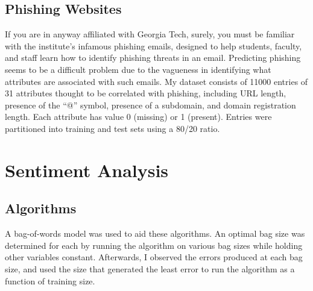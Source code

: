\documentclass[11pt, a4paper]{article} %
\begin{document}
\subsection{Phishing Websites} %
If you are in anyway affiliated with Georgia Tech, surely, you must be familiar with the institute's infamous phishing emails, designed to help students, faculty, and staff learn how to identify phishing threats in an email. Predicting phishing seems to be a difficult problem due to the vagueness in identifying what attributes are associated with such emails. My dataset consists of 11000 entries of 31 attributes thought to be correlated with phishing, including URL length, presence of the ``@'' symbol, presence of a subdomain, and domain registration length. Each attribute has value 0 (missing) or 1 (present). Entries were partitioned into training and test sets using a 80/20 ratio.


\section{Sentiment Analysis}

\subsection{Algorithms} A bag-of-words model was used to aid these algorithms. An optimal bag size was determined for each by running the algorithm on various bag sizes while holding other variables constant. Afterwards, I observed the errors produced at each bag size, and used the size that generated the least error to run the algorithm as a function of training size.
\end{document}
